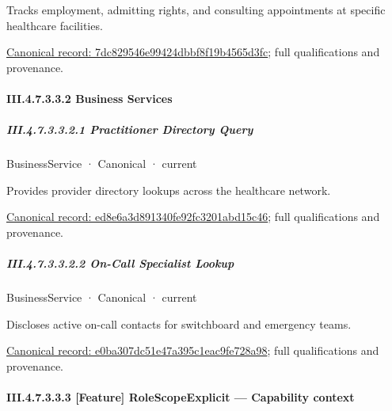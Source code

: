 Tracks employment, admitting rights, and consulting appointments at specific healthcare facilities.


{\footnotesize \href{../../../../../../../continuum/business/business-function/7dc829546e99424dbbf8f19b4565d3fc.md}{Canonical record: 7dc829546e99424dbbf8f19b4565d3fc}; full qualifications and provenance.}\par
\paragraph*{III.4.7.3.3.2 Business Services}
\label{navigation:III.4.7.3.3.2}

\subparagraph*{III.4.7.3.3.2.1 Practitioner Directory Query}
\label{navigation:III.4.7.3.3.2.1}

\label{element:ed8e6a3d891340fe92fc3201abd15c46}
{\small BusinessService · Canonical · current}\par

Provides provider directory lookups across the healthcare network.


{\footnotesize \href{../../../../../../../continuum/business/business-service/ed8e6a3d891340fe92fc3201abd15c46.md}{Canonical record: ed8e6a3d891340fe92fc3201abd15c46}; full qualifications and provenance.}\par
\subparagraph*{III.4.7.3.3.2.2 On-Call Specialist Lookup}
\label{navigation:III.4.7.3.3.2.2}

\label{element:e0ba307dc51e47a395c1eac9fe728a98}
{\small BusinessService · Canonical · current}\par

Discloses active on-call contacts for switchboard and emergency teams.


{\footnotesize \href{../../../../../../../continuum/business/business-service/e0ba307dc51e47a395c1eac9fe728a98.md}{Canonical record: e0ba307dc51e47a395c1eac9fe728a98}; full qualifications and provenance.}\par
\paragraph*{III.4.7.3.3.3 [Feature] RoleScopeExplicit — Capability context}
\label{navigation:III.4.7.3.3.3}

